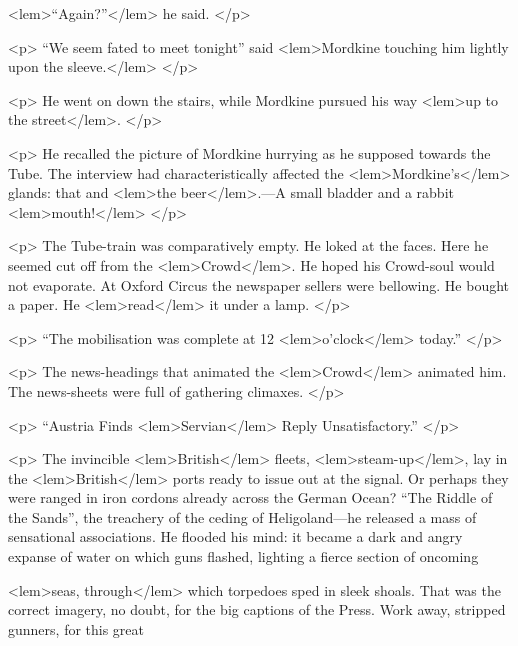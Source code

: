 {{<lem>“Again?”</lem>{} he said. 
 				</p> 

				<p>
				“We seem fated to meet tonight” said 
<lem>Mordkine  touching him lightly upon the sleeve.</lem>
					{} 
 				</p> 

				<p>
				He went on down the stairs, while Mordkine pursued his way 
<lem>up to the street</lem>{}. 
 				</p> 

				<p>
				He recalled the picture of Mordkine hurrying as he supposed towards the Tube. The interview 
				had characteristically affected the 
<lem>Mordkine's</lem>
					{}
				glands: that and 
<lem>the beer</lem>{}.---A small bladder  
				and a rabbit 
<lem>mouth!</lem>{} 
				</p> 

				<p>
The Tube-train was comparatively empty. He loked at the faces. Here he seemed cut off 
				from the 
<lem>Crowd</lem>{}. He hoped his Crowd-soul would not evaporate. At Oxford Circus the 
				newspaper sellers were bellowing. He bought a paper. He 
<lem>read</lem>
					{} 
				it under a lamp. 
 				</p> 

				<p>
				“The mobilisation was complete at 12 
<lem>o'clock</lem>
					{} 
				today.” 
 				</p> 

				<p>
				The news-headings that animated the 
<lem>Crowd</lem>{} animated him. The news-sheets were full of 
				gathering climaxes. 
				</p> 

				<p>
				“Austria Finds 
<lem>Servian</lem>{} Reply Unsatisfactory.”  
				</p> 

				<p>
				The invincible 
<lem>British</lem>{} fleets, 
<lem>steam-up</lem>{}, 
				lay in the 
<lem>British</lem>{} ports ready to issue 
				out at the signal. Or perhaps they were ranged in iron cordons already across the 
				German Ocean? “The Riddle of the Sands”, the treachery of the ceding of Heligoland---he 
				released a mass of sensational associations. He flooded his mind: it became a dark 
				and angry expanse of water on which guns flashed, lighting a fierce section of oncoming 
				
<lem>seas, through</lem>
					{} 
				which torpedoes sped in sleek shoals. That was the correct imagery, no doubt, 
				for the big captions of the Press. Work away, stripped gunners, for this great 
				
}}
